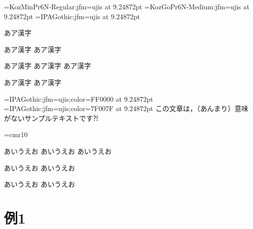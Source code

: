 \documentclass{ltjsarticle}
\begin{document}
\jfont\jaA={KozMinPr6N-Regular:jfm=ujis} at 9.24872pt
\jfont\jaB={KozGoPr6N-Medium:jfm=ujis}   at 9.24872pt
\jfont\jaC={IPAGothic:jfm=ujis}          at 9.24872pt

\jaA 
あア漢字%

\ltjdeclarealtfont\jaA{}
あア漢字%
\ltjdeclarealtfont\jaA{}
あア漢字%

\ltjdeclarealtfont\jaA{}
\ltjdeclarealtfont\jaA{}
あア漢字%
\mc
あア漢字%
\jaA 
あア漢字%

\jaA 
あア漢字%
\ltjclearaltfont\jaA
あア漢字%

\jfont\jaR={IPAGothic:jfm=ujis;color=FF0000} at 9.24872pt
\jfont\jaP={IPAGothic:jfm=ujis;color=7F007F} at 9.24872pt
\jaA 
\ltjdeclarealtfont\jaA{}
\ltjdeclarealtfont\jaA{}
この文章は，（あんまり）意味がないサンプルテキストです⁈

\scrollmode
\font\g=cmr10
\ltjdeclarealtfont\jaA{}%
\ltjdeclarealtfont\g{}%
\errorstopmode


\mc
あいうえお%
\selectfont あいうえお%
{\Large  あいうえお}

{%
}%
\selectfont あいうえお%
{\Large  あいうえお}

{\Large  あいうえお}%
あいうえお%

\section{例1}


\end{document}
